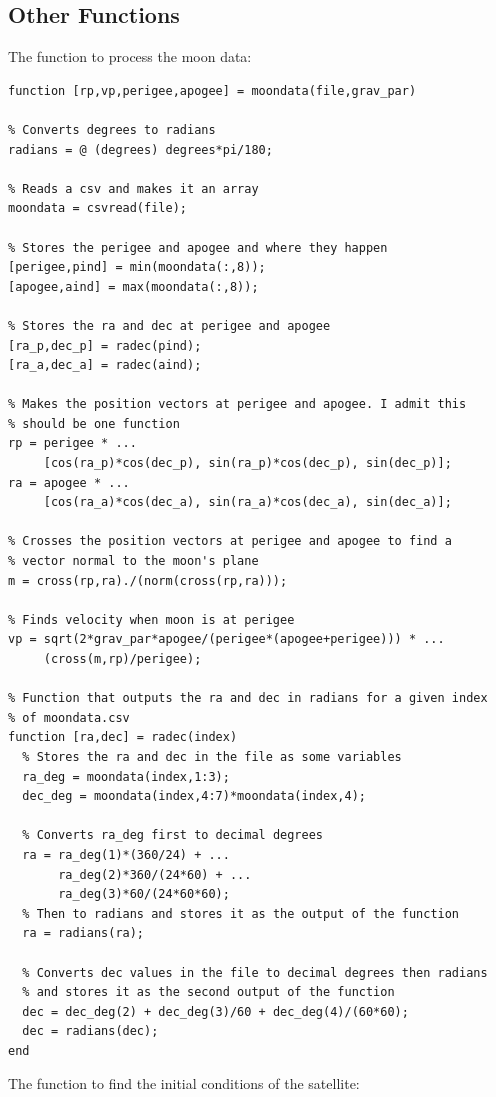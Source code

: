 \documentclass{article}
\begin{document}
\subsection{Other Functions}

\noindent
The function to process the moon data:

\begin{verbatim}
function [rp,vp,perigee,apogee] = moondata(file,grav_par)

% Converts degrees to radians
radians = @ (degrees) degrees*pi/180;

% Reads a csv and makes it an array
moondata = csvread(file);

% Stores the perigee and apogee and where they happen
[perigee,pind] = min(moondata(:,8));
[apogee,aind] = max(moondata(:,8));

% Stores the ra and dec at perigee and apogee
[ra_p,dec_p] = radec(pind);
[ra_a,dec_a] = radec(aind);

% Makes the position vectors at perigee and apogee. I admit this
% should be one function
rp = perigee * ...
     [cos(ra_p)*cos(dec_p), sin(ra_p)*cos(dec_p), sin(dec_p)];
ra = apogee * ...
     [cos(ra_a)*cos(dec_a), sin(ra_a)*cos(dec_a), sin(dec_a)];

% Crosses the position vectors at perigee and apogee to find a
% vector normal to the moon's plane
m = cross(rp,ra)./(norm(cross(rp,ra)));

% Finds velocity when moon is at perigee
vp = sqrt(2*grav_par*apogee/(perigee*(apogee+perigee))) * ...
     (cross(m,rp)/perigee);

% Function that outputs the ra and dec in radians for a given index
% of moondata.csv
function [ra,dec] = radec(index)
  % Stores the ra and dec in the file as some variables
  ra_deg = moondata(index,1:3);
  dec_deg = moondata(index,4:7)*moondata(index,4);

  % Converts ra_deg first to decimal degrees
  ra = ra_deg(1)*(360/24) + ...
       ra_deg(2)*360/(24*60) + ...
       ra_deg(3)*60/(24*60*60);
  % Then to radians and stores it as the output of the function
  ra = radians(ra);

  % Converts dec values in the file to decimal degrees then radians
  % and stores it as the second output of the function
  dec = dec_deg(2) + dec_deg(3)/60 + dec_deg(4)/(60*60);
  dec = radians(dec);
end
\end{verbatim}

\noindent
The function to find the initial conditions of the satellite:
\end{document}
